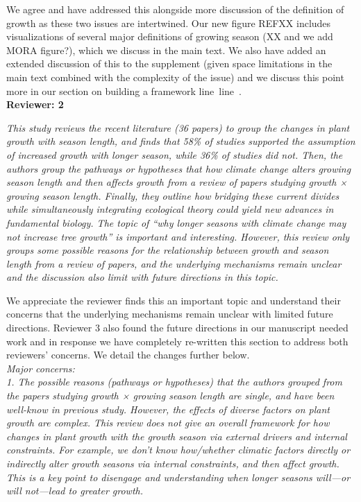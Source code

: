 \documentclass[11pt]{article}
\newcommand{\lr}[1]{line~\lineref{#1}}
\begin{document}
We agree and have addressed this alongside more discussion of the definition of growth as these two issues are intertwined. Our new figure REFXX includes visualizations of several major definitions of growing season (XX and we add MORA figure?), which we discuss in the main text. We also have added an extended discussion of this to the supplement (given space limitations in the main text combined with the complexity of the issue) and we discuss this point more in our section on building a framework \lr{R1gslS}\lr{R1gslE}.\\

{\bf Reviewer: 2}


\emph{This study reviews the recent literature (36 papers) to group the changes in plant growth with season length, and finds that 58\% of studies supported the assumption of increased growth with longer season, while 36\% of studies did not. Then, the authors group the pathways or hypotheses that how climate change alters growing season length and then affects growth from a review of papers studying growth × growing season length. Finally, they outline how bridging these current divides while simultaneously integrating ecological theory could yield new advances in fundamental biology. The topic of ``why longer seasons with climate change may not increase tree growth'' is important and interesting. However, this review only groups some possible reasons for the relationship between growth and season length from a review of papers, and the underlying mechanisms remain unclear and the discussion also limit with future directions in this topic.}

We appreciate the reviewer finds this an important topic and understand their concerns that the underlying mechanisms remain unclear with limited future directions. Reviewer 3 also found the future directions in our manuscript needed work and in response we have completely re-written this section to address both reviewers' concerns. We detail the changes further below. \\


\emph{Major concerns:}\\
\emph{1. The possible reasons (pathways or hypotheses) that the authors grouped from the papers studying growth × growing season length are single, and have been well-know in previous study. However, the effects of diverse factors on plant growth are complex. This review does not give an overall framework for how changes in plant growth with the growth season via external drivers and internal constraints. For example, we don’t know how/whether climatic factors directly or indirectly alter growth seasons via internal constraints, and then affect growth. This is a key point to disengage and understanding when longer seasons will---or will not---lead to greater growth.}
\end{document}

